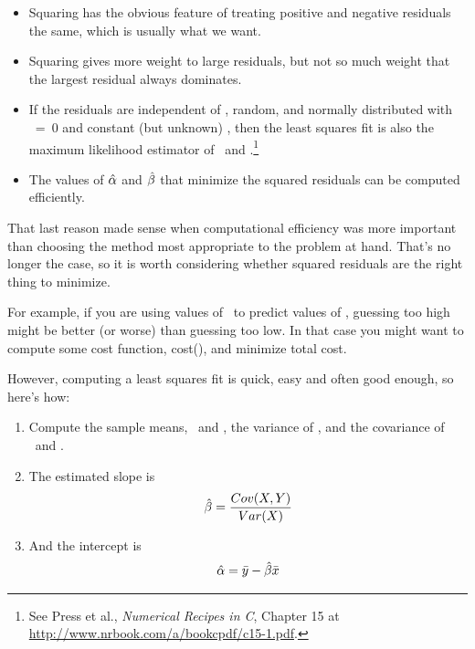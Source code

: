 \documentclass[12pt]{book}
\begin{document}
\begin{itemize}

\item Squaring has the obvious feature of treating positive and
negative residuals the same, which is usually what we want.

\item Squaring gives more weight to large residuals, but not
so much weight that the largest residual always dominates.

\item If the residuals are independent of \x, random, and normally
  distributed with \mymu~=~0 and constant (but unknown) \mysigma, then
  the least squares fit is also the maximum likelihood estimator of
  \myinter~and \myslope.\footnote{See Press et al., {\em Numerical Recipes in C},
    Chapter 15 at \url{http://www.nrbook.com/a/bookcpdf/c15-1.pdf}.}

\item The values of $\hat{\alpha}$ and $\hat{\beta}$ that minimize
  the squared residuals can be computed efficiently.

\end{itemize}

That last reason made sense when computational efficiency was more
important than choosing the method most appropriate to the problem
at hand.  That's no longer the case, so it is worth considering
whether squared residuals are the right thing to minimize.

For example, if you are using values of \X~to predict values of \Y,
guessing too high might be better (or worse) than guessing too low.
In that case you might want to compute some cost function,
cost(\myeps{}), and minimize total cost.

However, computing a least squares fit is quick, easy and often good
enough, so here's how:

\begin{enumerate}

\item Compute the sample means, \myxbar~and \myybar, the variance
of \X, and the covariance of \X~and \Y.

\item The estimated slope is
%
\[ \hat{\beta} = \frac{Cov(X,Y)}{Var(X)} \]
%
\item And the intercept is
%
\[ \hat{\alpha} = \bar{y} - \hat{\beta} \bar{x} \]
%
\end{enumerate}
\end{document}

